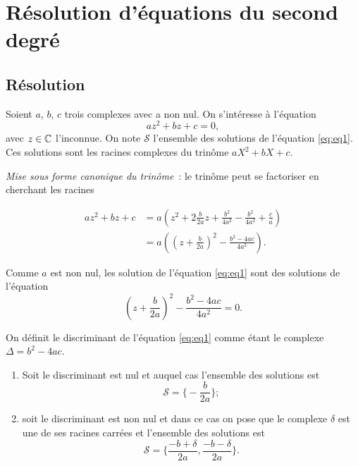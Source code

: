 \section{Résolution d'équations du second degré}
\label{sec:resolutionequationseconddegre}

\subsection{Résolution}
\label{subsec:resolution}

Soient \(a\), \(b\), \(c\) trois complexes avec a non nul. On s'intéresse à 
l'équation
\begin{equation}
    \label{eq:eq1}
    az^2 + bz + c = 0,
\end{equation}
avec \(z \in \mathbb{C}\) l'inconnue. On note \(\mathcal{S}\) l'ensemble des solutions 
de l'équation \eqref{eq:eq1}. Ces solutions sont les racines complexes du 
trinôme \(aX^2 + bX + c\).

\emph{Mise sous forme canonique du trinôme}~: le trinôme peut se factoriser en 
cherchant les racines

\begin{align}
    az^2 + bz + c &= a \left(z^2+ 2 \frac{b}{2a}z + \frac{b^2}{4a^2} - 
    \frac{b^2}{4a^2}  + \frac{c}{a} \right)\\
              & = a \left( \left(z + \frac{b}{2a} \right)^2 - \frac{b^2-4ac}{4a^2} 
              \right).
\end{align}

Comme \(a\) est non nul, les solution de l'équation \eqref{eq:eq1} sont des 
solutions de l'équation
\begin{equation}
    \left(z + \frac{b}{2a} \right)^2 - \frac{b^2-4ac}{4a^2}  = 0.
\end{equation}

\begin{defdef}
    On définit le discriminant de l'équation \eqref{eq:eq1} comme étant le 
    complexe \(\Delta = b^2-4ac\).
\end{defdef}

\begin{enumerate}
    \item Soit le discriminant est nul et auquel cas l'ensemble des solutions 
        est
    \begin{equation}
        \mathcal{S} = \biggl\lbrace-\frac{b}{2a} \biggl\rbrace;
    \end{equation}
    \item soit le discriminant est non nul et dans ce cas on pose que le 
        complexe \(\delta\) est une de ses racines carrées et l'ensemble des 
        solutions est
    \begin{equation}
        \mathcal{S} = \biggl\lbrace \frac{-b + \delta}{2a} , \frac{-b-\delta}{2a} 
            \biggl\rbrace.
    \end{equation}
\end{enumerate}

